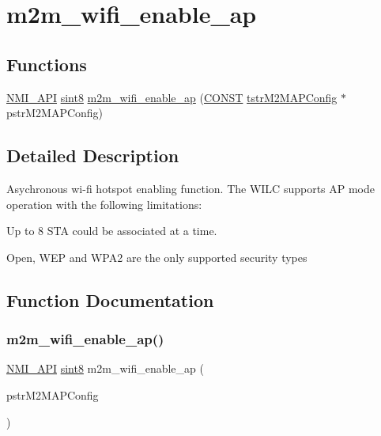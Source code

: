 \hypertarget{group__WifiEnableApFn}{}\section{m2m\+\_\+wifi\+\_\+enable\+\_\+ap}
\label{group__WifiEnableApFn}
\subsection*{Functions}
\begin{DoxyCompactItemize}
\item 
\hyperlink{group__BSPDefine_gaecc0323d771e41ef81a76b5f12783e22}{N\+M\+I\+\_\+\+A\+PI} \hyperlink{group__DataT_gae35f10ffd0ac8dd2bc3e794da9bdfbc7}{sint8} \hyperlink{group__WifiEnableApFn_gab34cff419964df3c4e1ed86076aef7ce}{m2m\+\_\+wifi\+\_\+enable\+\_\+ap} (\hyperlink{group__BSPDefine_ga0c33b494a68ce28497e7ce8e5e95feff}{C\+O\+N\+ST} \hyperlink{structtstrM2MAPConfig}{tstr\+M2\+M\+A\+P\+Config} $\ast$pstr\+M2\+M\+A\+P\+Config)
\end{DoxyCompactItemize}


\subsection{Detailed Description}
Asychronous wi-\/fi hotspot enabling function. The W\+I\+LC supports AP mode operation with the following limitations\+:
\begin{DoxyItemize}
\item Up to 8 S\+TA could be associated at a time.
\item Open, W\+EP and W\+P\+A2 are the only supported security types 
\end{DoxyItemize}

\subsection{Function Documentation}
\mbox{\label{group__WifiEnableApFn_gab34cff419964df3c4e1ed86076aef7ce}} 
\subsubsection{\texorpdfstring{m2m\+\_\+wifi\+\_\+enable\+\_\+ap()}{m2m\_wifi\_enable\_ap()}}
{\footnotesize\ttfamily \hyperlink{group__BSPDefine_gaecc0323d771e41ef81a76b5f12783e22}{N\+M\+I\+\_\+\+A\+PI} \hyperlink{group__DataT_gae35f10ffd0ac8dd2bc3e794da9bdfbc7}{sint8} m2m\+\_\+wifi\+\_\+enable\+\_\+ap (\begin{DoxyParamCaption}\item[{\hyperlink{group__BSPDefine_ga0c33b494a68ce28497e7ce8e5e95feff}{C\+O\+N\+ST} \hyperlink{structtstrM2MAPConfig}{tstr\+M2\+M\+A\+P\+Config} $\ast$}]{pstr\+M2\+M\+A\+P\+Config }\end{DoxyParamCaption})}



